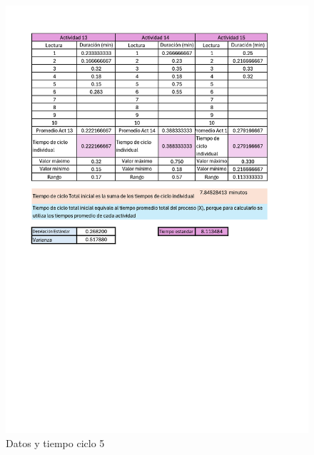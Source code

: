     \begin{figure}[H]
        \centering
        \includegraphics[trim = {15mm 100mm 20mm 
        0mm},clip,scale=0.4]{16/Img/muestreo5}
        \caption{Datos y tiempo ciclo 5}
        \label{fig:Datos y tiempo ciclo 5}
         \end{figure}
         
